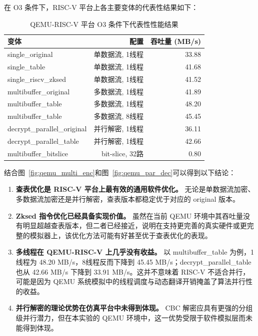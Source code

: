 在 O3 条件下，RISC-V 平台上各主要变体的代表性结果如下：

\begin{table}[H]
\centering
\caption{QEMU-RISC-V 平台 O3 条件下代表性性能结果}
\label{tab:qemu_o3_summary}
\begin{tabular}{lrr}
\hline
\textbf{变体} & \textbf{配置} & \textbf{吞吐量 (MB/s)} \\
\hline
single\_original              & 单数据流, 1线程   & 33.88 \\
single\_table                 & 单数据流, 1线程   & 41.68 \\
single\_riscv\_zksed          & 单数据流, 1线程   & 41.52 \\
multibuffer\_original         & 多数据流, 1线程   & 41.89 \\
multibuffer\_table            & 多数据流, 1线程   & 48.20 \\
multibuffer\_table            & 多数据流, 8线程   & 45.45 \\
decrypt\_parallel\_original   & 并行解密, 1线程   & 36.11 \\
decrypt\_parallel\_table      & 并行解密, 1线程   & 42.66 \\
multibuffer\_bitslice         & bit-slice, 32路   & 0.80 \\
\hline
\end{tabular}
\end{table}

结合图~\ref{fig:qemu_multi_enc}和图~\ref{fig:qemu_par_dec}可以得到以下结论：

\begin{enumerate}
    \item \textbf{查表优化是 RISC-V 平台上最有效的通用软件优化。} 无论是单数据流加密、多数据流加密还是并行解密，查表版本都稳定优于对应的 original 版本。
    \item \textbf{Zksed 指令优化已经具备实现价值。} 虽然在当前 QEMU 环境中其吞吐量没有明显超越查表版本，但二者已经接近，说明在支持更完善的真实硬件或更完整的模拟器上，该优化方法可能有好甚至优于查表优化的表现。
    \item \textbf{多线程在 QEMU-RISC-V 上几乎没有收益。} 以 multibuffer\_table 为例，1线程为 48.20 MB/s，8线程反而下降到 45.45 MB/s；decrypt\_parallel\_table 也从 42.66 MB/s 下降到 33.91 MB/s。这并不意味着 RISC-V 不适合并行，可能是因为 QEMU 系统模拟中的线程调度与动态翻译开销掩盖了算法并行性的收益。
    \item \textbf{并行解密的理论优势在仿真平台中未得到体现。} CBC 解密应具有更强的分组级并行潜力，但在本实验的 QEMU 环境中，这一优势受限于软件模拟层而未能得到体现。
\end{enumerate}

